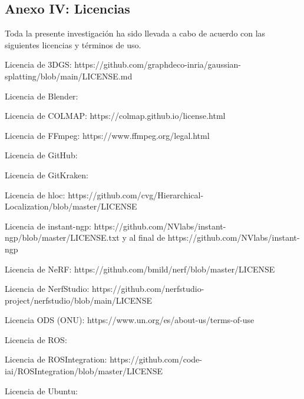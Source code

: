 \documentclass[a4paper, 12pt, spanish, twoside]{article}
\begin{document}
\printglossary[title=Glosario, toctitle=Glosario]

\newpage
\printglossary[type=\acronymtype, title={Abreviaturas, unidades y acrónimos}, toctitle={Abreviaturas, unidades y acrónimos}]


\clearpage




\newpage
\subsection{Anexo IV: Licencias} \label{sec:anexo4}

Toda la presente investigación ha sido llevada a cabo de acuerdo con las siguientes licencias y términos de uso.

Licencia de 3DGS: https://github.com/graphdeco-inria/gaussian-splatting/blob/main/LICENSE.md

Licencia de Blender: 

Licencia de COLMAP: https://colmap.github.io/license.html

Licencia de FFmpeg: https://www.ffmpeg.org/legal.html

Licencia de GitHub: 

Licencia de GitKraken: 

Licencia de hloc: https://github.com/cvg/Hierarchical-Localization/blob/master/LICENSE

Licencia de instant-ngp: https://github.com/NVlabs/instant-ngp/blob/master/LICENSE.txt y al final de https://github.com/NVlabs/instant-ngp

Licencia de NeRF: https://github.com/bmild/nerf/blob/master/LICENSE

Licencia de NerfStudio: https://github.com/nerfstudio-project/nerfstudio/blob/main/LICENSE

Licencia ODS (ONU): https://www.un.org/es/about-us/terms-of-use

Licencia de ROS: 

Licencia de ROSIntegration: https://github.com/code-iai/ROSIntegration/blob/master/LICENSE

Licencia de Ubuntu: 
\end{document}
